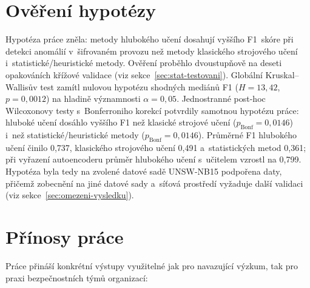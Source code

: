 \section*{Ověření hypotézy}

Hypotéza práce zněla: metody hlubokého učení dosahují vyššího F1~skóre při detekci anomálií v~šifrovaném provozu než metody klasického strojového učení i~statistické/heuristické metody. Ověření proběhlo dvoustupňově na deseti opakováních křížové validace (viz sekce~\ref{sec:stat-testovani}). Globální Kruskal--Wallisův test zamítl nulovou hypotézu shodných mediánů F1 ($H = 13{,}42$, $p = 0{,}0012$) na hladině významnosti $\alpha = 0{,}05$. Jednostranné post-hoc Wilcoxonovy testy s~Bonferroniho korekcí potvrdily samotnou hypotézu práce: hluboké učení dosáhlo vyššího F1 než klasické strojové učení ($p_{\mathrm{Bonf}} = 0{,}0146$) i~než statistické/heuristické metody ($p_{\mathrm{Bonf}} = 0{,}0146$). Průměrné F1 hlubokého učení činilo 0{,}737, klasického strojového učení 0{,}491 a~statistických metod 0{,}361; při vyřazení autoencoderu průměr hlubokého učení s~učitelem vzrostl na 0{,}799. Hypotéza byla tedy na zvolené datové sadě UNSW-NB15 podpořena daty, přičemž zobecnění na jiné datové sady a~síťová prostředí vyžaduje další validaci (viz sekce~\ref{sec:omezeni-vysledku}).

\section*{Přínosy práce}

Práce přináší konkrétní výstupy využitelné jak pro navazující výzkum, tak pro praxi bezpečnostních týmů organizací:

